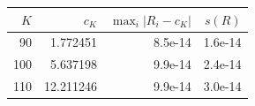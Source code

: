 \begin{tabular}{rrrr}
\toprule
$K$ & $c_K$ & $\max_i |R_i - c_K|$ & $s(R)$ \\
\midrule
90 & 1.772451 & 8.5e-14 & 1.6e-14 \\
100 & 5.637198 & 9.9e-14 & 2.4e-14 \\
110 & 12.211246 & 9.9e-14 & 3.0e-14 \\
\bottomrule
\end{tabular}

